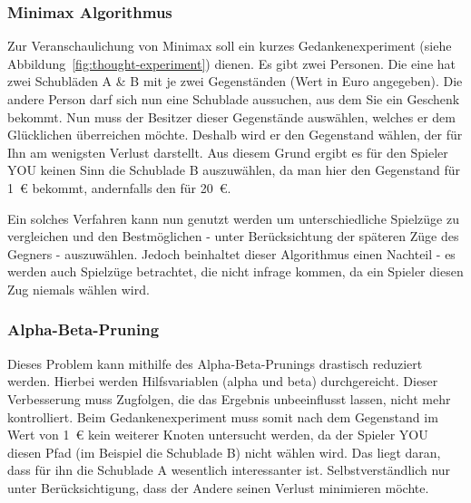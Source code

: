 \subsubsection{Minimax Algorithmus}\label{subsubsec:minimax-algorithmus}
Zur Veranschaulichung von Minimax soll ein kurzes Gedankenexperiment (siehe Abbildung~\ref{fig:thought-experiment}) dienen.
Es gibt zwei Personen.
Die eine hat zwei Schubl\"aden A \& B mit je zwei Gegenst\"anden (Wert in Euro angegeben).
Die andere Person darf sich nun eine Schublade aussuchen, aus dem Sie ein Geschenk bekommt.
Nun muss der Besitzer dieser Gegenst\"ande ausw\"ahlen, welches er dem Gl\"ucklichen \"uberreichen m\"ochte.
Deshalb wird er den Gegenstand w\"ahlen, der f\"ur Ihn am wenigsten Verlust darstellt.
Aus diesem Grund ergibt es f\"ur den Spieler YOU keinen Sinn die Schublade B auszuw\"ahlen, da man hier den Gegenstand f\"ur 1~\euro{} bekommt, andernfalls den f\"ur 20~\euro{}.

\vspace{1em}
\begin{center}
    \label{fig:thought-experiment}
\end{center}

Ein solches Verfahren kann nun genutzt werden um unterschiedliche Spielz\"uge zu vergleichen und den Bestm\"oglichen - unter Ber\"ucksichtung der sp\"ateren Z\"uge des Gegners - auszuw\"ahlen.
Jedoch beinhaltet dieser Algorithmus einen Nachteil - es werden auch Spielz\"uge betrachtet, die nicht infrage kommen, da ein Spieler diesen Zug niemals w\"ahlen wird.

\subsubsection{Alpha-Beta-Pruning}\label{subsubsec:alpha-beta-pruning}
Dieses Problem kann mithilfe des Alpha-Beta-Prunings drastisch reduziert werden.
Hierbei werden Hilfsvariablen (alpha und beta) durchgereicht.
Dieser Verbesserung muss Zugfolgen, die das Ergebnis unbeeinflusst lassen, nicht mehr kontrolliert.
Beim Gedankenexperiment muss somit nach dem Gegenstand im Wert von 1~\euro{} kein weiterer Knoten untersucht werden, da der Spieler YOU diesen Pfad (im Beispiel die Schublade B) nicht w\"ahlen wird.
Das liegt daran, dass f\"ur ihn die Schublade A wesentlich interessanter ist.
Selbstverst\"andlich nur unter Ber\"ucksichtigung, dass der Andere seinen Verlust minimieren m\"ochte.

